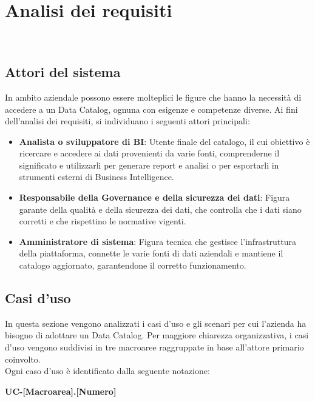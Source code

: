 \chapter{Analisi dei requisiti}
\label{cap:analisi-requisiti}

\\

\section{Attori del sistema}
In ambito aziendale possono essere molteplici le figure che hanno la necessità di accedere a un Data Catalog, ognuna con esigenze e competenze diverse. 
Ai fini dell'analisi dei requisiti, si individuano i seguenti attori principali:
\begin{itemize}
    \item \textbf{Analista o sviluppatore di BI}: Utente finale del catalogo, il cui obiettivo è ricercare e accedere ai dati provenienti da varie fonti, comprenderne il significato e 
    utilizzarli per generare report e analisi o per esportarli in strumenti esterni di Business Intelligence.
    \item \textbf{Responsabile della Governance e della sicurezza dei dati}: Figura garante della qualità e della sicurezza dei dati, che controlla che i dati siano corretti e che rispettino le normative vigenti.
    \item \textbf{Amministratore di sistema}: Figura tecnica che gestisce l'infrastruttura della piattaforma, connette le varie fonti di dati aziendali e mantiene il catalogo aggiornato, garantendone il corretto funzionamento.
\end{itemize}


\section{Casi d'uso}
In questa sezione vengono analizzati i casi d'uso e gli scenari per cui l'azienda ha bisogno di adottare un Data Catalog. 
Per maggiore chiarezza organizzativa, i casi d'uso vengono suddivisi in tre macroaree raggruppate in base all'attore primario coinvolto.\\
Ogni caso d'uso è identificato dalla seguente notazione:
\begin{center}
    \textbf{UC-[Macroarea].[Numero]}
\end{center}

